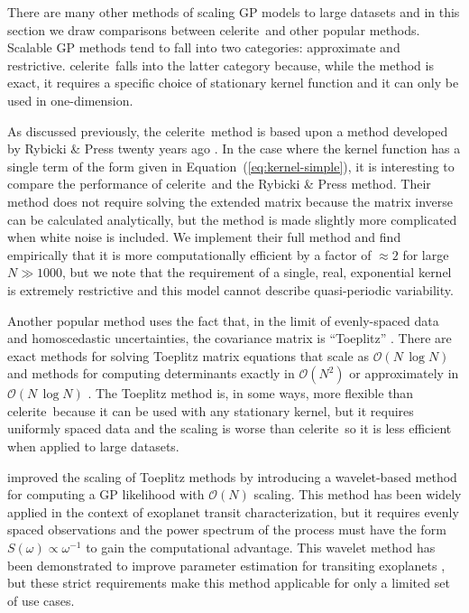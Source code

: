 \documentclass[manuscript, letterpaper]{aastex6}
\newcommand{\project}[1]{\textsf{#1}}
\newcommand{\celerite}{\project{celerite}}
\renewcommand{\eqref}[1]{\ref{eq:#1}}
\newcommand{\Eq}[1]{Equation~(\eqref{#1})}
\newcommand{\eq}[1]{\Eq{#1}}
\begin{document}
There are many other methods of scaling GP models to large datasets and in
this section we draw comparisons between \celerite\ and other popular methods.
Scalable GP methods tend to fall into two categories: approximate and
restrictive.
\celerite\ falls into the latter category because, while the method is exact,
it requires a specific choice of stationary kernel function and it can only be
used in one-dimension.

As discussed previously, the \celerite\ method is based upon a method
developed by Rybicki \& Press twenty years ago \citep{Rybicki:1995}.
In the case where the kernel function has a single term of the form given in
\eq{kernel-simple}, it is interesting to compare the performance of \celerite\
and the Rybicki \& Press method.
Their method does not require solving the extended matrix because the matrix
inverse can be calculated analytically, but the method is made slightly more
complicated when white noise is included.
We implement their full method and find empirically that it is more
computationally efficient by a factor of $\approx 2$ for large $N \gg 1000$,
but we note that the requirement of a single, real, exponential kernel is
extremely restrictive and this model cannot describe quasi-periodic
variability.

Another popular method uses the fact that, in the limit of evenly-spaced data
and homoscedastic uncertainties, the covariance matrix is ``Toeplitz''
\citep[for example][]{Dillon:2013}.
There are exact methods for solving Toeplitz matrix equations that scale as
$\mathcal{O}(N\,\log N)$ and methods for computing determinants exactly in
$\mathcal{O}(N^2)$ or approximately in $\mathcal{O}(N\,\log N)$
\citep{Wilson:2014}.
The Toeplitz method is, in some ways, more flexible than \celerite\ because it
can be used with any stationary kernel, but it requires uniformly spaced data
and the scaling is worse than \celerite\ so it is less efficient when applied
to large datasets.

\citet{Carter:2009} improved the scaling of Toeplitz methods by introducing a
wavelet-based method for computing a GP likelihood with $\mathcal{O}(N)$
scaling.
This method has been widely applied in the context of exoplanet transit
characterization, but it requires evenly spaced observations and the power
spectrum of the process must have the form $S(\omega)\propto \omega^{-1}$ to
gain the computational advantage.
This wavelet method has been demonstrated to improve parameter estimation for
transiting exoplanets \citep{Carter:2009}, but these strict requirements make
this method applicable for only a limited set of use cases.
\end{document}

